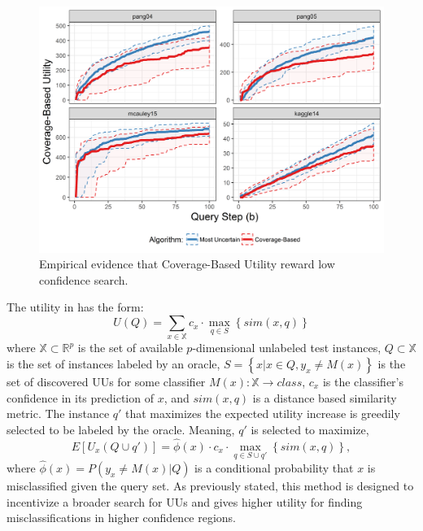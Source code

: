 \documentclass[letterpaper]{article} %
\begin{document}
\begin{figure}[h!]
  \centering
  \includegraphics[width=\textwidth]{../experimentsAndPlots/CoverageVsMostUncertainPlaceholder.png}
  \caption{Empirical evidence that Coverage-Based Utility reward low confidence search.}
  \label{fig:coverutil}
\end{figure}

The utility in \citet{Bansal2018} has the form: $$U(Q) = \sum_{x \in \mathbb{X}} c_x \cdot \max_{q \in S} \left\{sim\left(x,q \right) \right\}$$ where $\mathbb{X} \subset \mathbb{R}^p$ is the set of available $p$-dimensional unlabeled test instances, $Q \subset \mathbb{X}$ is the set of instances labeled by an oracle, $S = \left\{x|x \in Q, y_x \neq M(x)\right\}$ is the set of discovered UUs for some classifier $M(x):\mathbb{X} \rightarrow class$, $c_x$ is the classifier's confidence in its prediction of $x$, and $sim(x,q)$ is a distance based similarity metric.  The instance $q'$ that maximizes the expected utility increase is greedily selected to be labeled by the oracle.  Meaning, $q'$ is selected to maximize, $$E\left[U_x\left(Q \cup q'\right)\right] = \hat{\phi}(x) \cdot c_x \cdot \max_{q \in S \cup q'} \left\{sim\left(x,q \right) \right\},$$ where $\hat{\phi}(x) = P\left(y_x \neq M(x) |Q \right)$ is a conditional probability that $x$ is misclassified given the query set.  As previously stated, this method is designed to incentivize a broader search for UUs and gives higher utility for finding misclassifications in higher confidence regions.  
\end{document}
